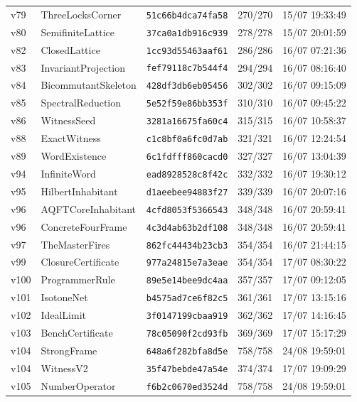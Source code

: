 \documentclass[11pt]{article}
\theoremstyle{definition}\newtheorem{deriv}{Derivação}
\begin{document}
{\begin{longtable}{@{}lllll@{}}
v79 & ThreeLocksCorner & \texttt{51c66b4dca74fa58} & 270/270 & 15/07 19:33:49 \\
v80 & SemifiniteLattice & \texttt{37ca0a1db916c939} & 278/278 & 15/07 20:01:59 \\
v82 & ClosedLattice & \texttt{1cc93d55463aaf61} & 286/286 & 16/07 07:21:36 \\
v83 & InvariantProjection & \texttt{fef79118c7b544f4} & 294/294 & 16/07 08:16:40 \\
v84 & BicommutantSkeleton & \texttt{428df3db6eb05456} & 302/302 & 16/07 09:15:09 \\
v85 & SpectralReduction & \texttt{5e52f59e86bb353f} & 310/310 & 16/07 09:45:22 \\
v86 & WitnessSeed & \texttt{3281a16675fa60c4} & 315/315 & 16/07 10:58:37 \\
v88 & ExactWitness & \texttt{c1c8bf0a6fc0d7ab} & 321/321 & 16/07 12:24:54 \\
v89 & WordExistence & \texttt{6c1fdfff860cacd0} & 327/327 & 16/07 13:04:39 \\
v94 & InfiniteWord & \texttt{ead8928528c8f42c} & 332/332 & 16/07 19:30:12 \\
v95 & HilbertInhabitant & \texttt{d1aeebee94883f27} & 339/339 & 16/07 20:07:16 \\
v96 & AQFTCoreInhabitant & \texttt{4cfd8053f5366543} & 348/348 & 16/07 20:59:41 \\
v96 & ConcreteFourFrame & \texttt{4c3d4ab63b2df108} & 348/348 & 16/07 20:59:41 \\
v97 & TheMasterFires & \texttt{862fc44434b23cb3} & 354/354 & 16/07 21:44:15 \\
v99 & ClosureCertificate & \texttt{977a24815e7a3eae} & 354/354 & 17/07 08:30:22 \\
v100 & ProgrammerRule & \texttt{89e5e14bee9dc4aa} & 357/357 & 17/07 09:12:05 \\
v101 & IsotoneNet & \texttt{b4575ad7ce6f82c5} & 361/361 & 17/07 13:15:16 \\
v102 & IdealLimit & \texttt{3f0147199cbaa919} & 362/362 & 17/07 14:16:45 \\
v103 & BenchCertificate & \texttt{78c05090f2cd93fb} & 369/369 & 17/07 15:17:29 \\
v104 & StrongFrame & \texttt{648a6f282bfa8d5e} & 758/758 & 24/08 19:59:01 \\
v104 & WitnessV2 & \texttt{35f47bebde47a54e} & 374/374 & 17/07 19:09:29 \\
v105 & NumberOperator & \texttt{f6b2c0670ed3524d} & 758/758 & 24/08 19:59:01 \\

\end{longtable}}
\end{document}
